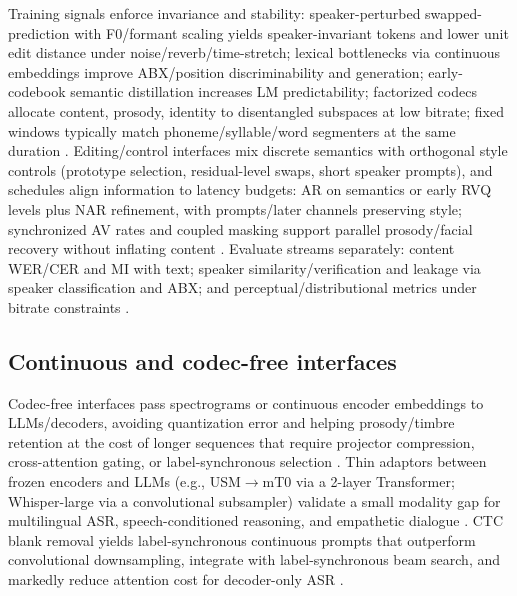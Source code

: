 \documentclass{article}
\begin{document}
Training signals enforce invariance and stability: speaker-perturbed swapped-prediction with F0/formant scaling yields speaker-invariant tokens and lower unit edit distance under noise/reverb/time-stretch; lexical bottlenecks via continuous embeddings improve ABX/position discriminability and generation; early-codebook semantic distillation increases LM predictability; factorized codecs allocate content, prosody, identity to disentangled subspaces at low bitrate; fixed windows typically match phoneme/syllable/word segmenters at the same duration \cite{chang2024dcspinspeakerinvariantspeechtokenizerspo,algayres2023generativespokenlanguagemodelbasedcontin,guo2025recentadvancesdiscretespeechtokensreview,kando2025exploringeffectsegmentationvocabularysiz}. Editing/control interfaces mix discrete semantics with orthogonal style controls (prototype selection, residual-level swaps, short speaker prompts), and schedules align information to latency budgets: AR on semantics or early RVQ levels plus NAR refinement, with prompts/later channels preserving style; synchronized AV rates and coupled masking support parallel prosody/facial recovery without inflating content \cite{chen2025emovaempoweringlanguagemodelsseehearspea,zhang2024speechtokenizerunifiedspeechtokenizerlar,peng2024mslms2stmultitaskspeechlanguagemodeltext,wang2025bossbeyondsemanticspeech,yang2025diffsoundstreamefficientspeechtokenizati,sadok2025vectorquantizedmaskedautoencoderaudiovis}. Evaluate streams separately: content WER/CER and MI with text; speaker similarity/verification and leakage via speaker classification and ABX; and perceptual/distributional metrics under bitrate constraints \cite{zhang2024speechtokenizerunifiedspeechtokenizerlar,guo2025recentadvancesdiscretespeechtokensreview}.

\subsection{Continuous and codec-free interfaces} \label{subsec:continuousandcodec-freeinterfaces}
Codec-free interfaces pass spectrograms or continuous encoder embeddings to LLMs/decoders, avoiding quantization error and helping prosody/timbre retention at the cost of longer sequences that require projector compression, cross-attention gating, or label-synchronous selection \cite{guo2025recentadvancesdiscretespeechtokensreview}. Thin adaptors between frozen encoders and LLMs (e.g., USM$\rightarrow$mT0 via a 2-layer Transformer; Whisper-large via a convolutional subsampler) validate a small modality gap for multilingual ASR, speech-conditioned reasoning, and empathetic dialogue \cite{wang2023slmbridgethingapbetweenspeechtextfoundat,wang2024blspemotowardsempatheticlargespeechlangu,nguyen2025qwenvsgemmaintegrationwhispercomparative}. CTC blank removal yields label-synchronous continuous prompts that outperform convolutional downsampling, integrate with label-synchronous beam search, and markedly reduce attention cost for decoder-only ASR \cite{tsunoo2024decoderonlyarchitecturespeechrecognition}.
\end{document}
